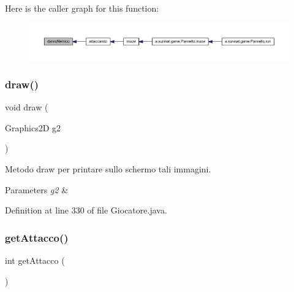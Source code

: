 Here is the caller graph for this function\+:
\nopagebreak
\begin{figure}[H]
\begin{center}
\leavevmode
\includegraphics[width=350pt]{class_entita_1_1_giocatore_a0814609fcd5c78e217a57e65bb65f7b4_icgraph}
\end{center}
\end{figure}
\mbox{\label{class_entita_1_1_giocatore_ae8c972c0fb4fcbc09c2219dd32cbd053}} 
\subsubsection{\texorpdfstring{draw()}{draw()}}
{\footnotesize\ttfamily void draw (\begin{DoxyParamCaption}\item[{Graphics2D}]{g2 }\end{DoxyParamCaption})}



Metodo draw per printare sullo schermo tali immagini. 


\begin{DoxyParams}{Parameters}
{\em g2} & \\
\hline
\end{DoxyParams}


Definition at line 330 of file Giocatore.\+java.

\mbox{\label{class_entita_1_1_giocatore_aafeab2e7e3b0e536c594b5aef8c31683}} 
\subsubsection{\texorpdfstring{get\+Attacco()}{getAttacco()}}
{\footnotesize\ttfamily int get\+Attacco (\begin{DoxyParamCaption}{ }\end{DoxyParamCaption})}



